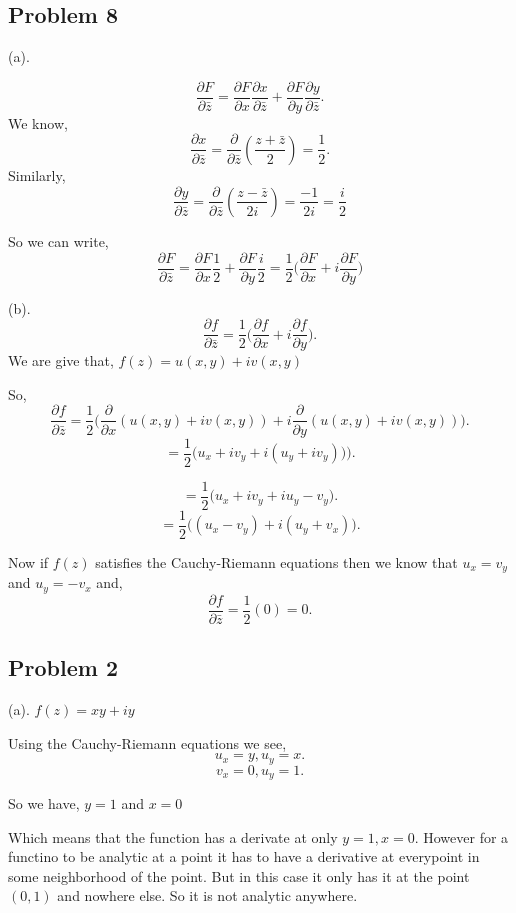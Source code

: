 \documentclass[a4paper]{report}
\begin{document}
\subsection*{Problem 8}
(a).

\[
    \frac{\partial  F}{\partial \bar z} =    \frac{\partial  F}{\partial x}    \frac{\partial  x}{\partial \bar z}   +    \frac{\partial  F}{\partial y}  \frac{\partial  y}{\partial \bar z}
.\] 
We know, \[
\frac{\partial  x}{\partial \bar z}  = \frac{\partial }{\partial \bar z}  (\frac{z + \bar z}{2}) = \frac{1}{2}
.\] 
Similarly, 
\[
\frac{\partial  y}{\partial \bar z}  = \frac{\partial }{\partial \bar z}  (\frac{z - \bar z}{2i}) = \frac{-1}{2i} = \frac{i}{2}
\]

So we can write, \[
    \frac{\partial  F}{\partial \bar z} =    \frac{\partial  F}{\partial x}   \frac{1}{2}   +    \frac{\partial  F}{\partial y}  \frac{i}{2} = \frac{1}{2}\bigg(   \frac{\partial  F}{\partial x} + i  \frac{\partial  F}{\partial y} \bigg)
\]

(b). \[
    \frac{\partial  f}{\partial \bar z} = \frac{1}{2}\bigg(   \frac{\partial  f}{\partial x} + i  \frac{\partial  f}{\partial y} \bigg)
.\] 
We are give that, $f(z) = u(x,y) + iv(x,y)$

So, \[
    \frac{\partial  f}{\partial \bar z} = \frac{1}{2}\bigg(   \frac{\partial}{\partial x}(u(x,y) + iv(x,y)) + i  \frac{\partial  }{\partial y} (u(x,y) + iv(x,y))\bigg)
.\] 
\[
= \frac{1}{2}\bigg(   u_x + iv_y + i(u_y + iv_y))\bigg)
.\] 

\[
= \frac{1}{2}\bigg(   u_x + iv_y + iu_y - v_y\bigg)
.\] 
\[
= \frac{1}{2}\bigg((u_x - v_y)+ i(u_y + v_x)\bigg)
.\] 

Now if $f(z)$ satisfies the Cauchy-Riemann equations then we know that  $u_x = v_y$ and  $u_y = -v_x$ and,  \[
\frac{\partial f}{\partial \bar z} = \frac{1}{2}(0) = 0
.\] 


\subsection*{Problem 2}
(a). $f(z) = xy + iy$

Using the Cauchy-Riemann equations we see, \[
u_x = y, u_y = x
.\] 
\[
v_x = 0, u_y = 1
.\] 

So we have, $y = 1$ and $x = 0$

Which means that the function has a derivate at only  $y = 1, x= 0$. However for a functino to be analytic at a point it has to have a derivative at everypoint in some neighborhood of the point. But in this case it only has it at the point  $(0,1)$ and nowhere else. So it is not analytic anywhere.
\end{document}
